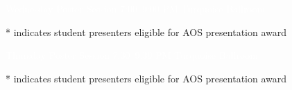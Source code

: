 \documentclass[twoside]{article}
\begin{document}
\thispagestyle{empty}
\pagestyle{fancy}

\setlength{\parindent}{0cm}

\newcommand\posterentry[3]{%
	\begin{minipage}{\linewidth}
	#1 \textbf{#2} \\ #3 \\
	\end{minipage}
}

\begin{shaded}
\Huge{\textcolor{white}{Wednesday Poster Session \normalsize 7:00--9:00 PM Turquoise Ballroom}}
\end{shaded}

* indicates student presenters eligible for AOS presentation award
 
\begin{multicols}{2}

\normalsize


\end{multicols}

\newpage

\begin{shaded}
\Huge{\textcolor{white}{Thursday Poster Session \normalsize 7:30--9:30 PM Turquoise Ballroom}}
\end{shaded}

* indicates student presenters eligible for AOS presentation award

\begin{multicols}{2}

\normalsize


\end{multicols}

%
\end{document}
